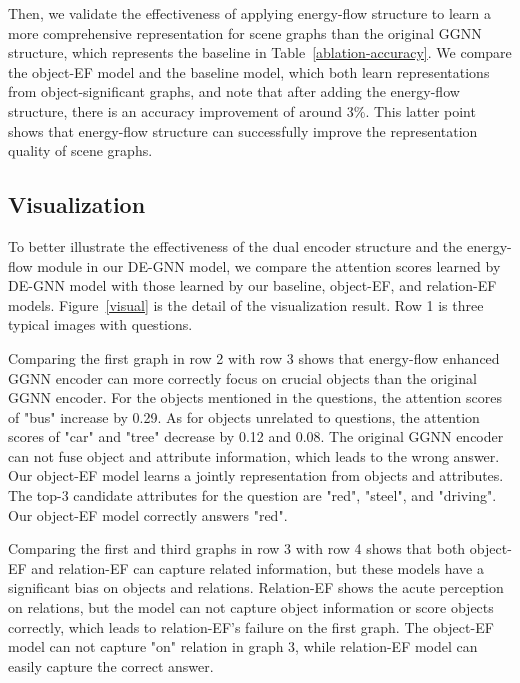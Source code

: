 \documentclass[letterpaper]{article} %
\begin{document}
Then, we validate the effectiveness of applying energy-flow structure to learn a more comprehensive representation for scene graphs than the original GGNN structure, which represents the baseline in Table~\ref{ablation-accuracy}. We compare the object-EF model and the baseline model, which both learn representations from object-significant graphs, and note that after adding the energy-flow structure, there is an accuracy improvement of around 3\%. 
This latter point shows that energy-flow structure can successfully improve the representation quality of scene graphs. 


\subsection{Visualization}
To better illustrate the effectiveness of the dual encoder structure and the energy-flow module in our DE-GNN model, we compare the attention scores learned by DE-GNN model with those learned by our baseline, object-EF, and relation-EF models. Figure~\ref{visual} is the detail of the visualization result. Row 1 is three typical images with questions. 

Comparing the first graph in row 2 with row 3 shows that energy-flow enhanced GGNN encoder can more correctly focus on crucial objects than the original GGNN encoder. For the objects mentioned in the questions, the attention scores of "bus" increase by 0.29. As for objects unrelated to questions, the attention scores of "car" and "tree" decrease by 0.12 and 0.08. The original GGNN encoder can not fuse object and attribute information, which leads to the wrong answer. Our object-EF model learns a jointly representation from objects and attributes. The top-3 candidate attributes for the question are "red", "steel", and "driving". Our object-EF model correctly answers "red".

Comparing the first and third graphs in row 3 with row 4 shows that both object-EF and relation-EF can capture related information, but these models have a significant bias on objects and relations. Relation-EF shows the acute perception on relations, but the model can not capture object information or score objects correctly, which leads to relation-EF's failure on the first graph. The object-EF model can not capture "on" relation in graph 3, while relation-EF model can easily capture the correct answer.
\end{document}

